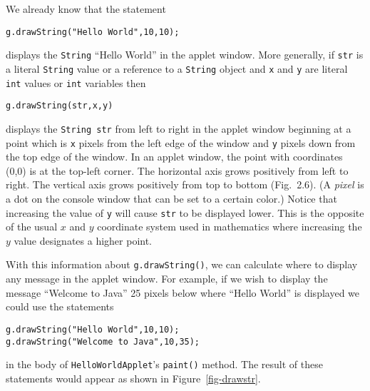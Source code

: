 We already know that the statement

\begin{jjjlisting}
\begin{lstlisting} 
g.drawString("Hello World",10,10);   
\end{lstlisting}
\end{jjjlisting}

\noindent displays the {\tt String} ``Hello World'' in the applet window.  More
generally, if {\tt str} is a literal {\tt String} value or a reference
to a {\tt String} object and {\tt x} and {\tt y} are literal {\tt int}
values or {\tt int} variables then

\begin{jjjlisting}
\begin{lstlisting}  
g.drawString(str,x,y) 
\end{lstlisting}
\end{jjjlisting}

\noindent displays the {\tt String str} from left to right in the applet window
beginning at a point which is {\tt x} pixels from the left edge of the
window and {\tt y} pixels down from the top edge of the window. In an
applet window, the point with coordinates (0,0) is at the top-left
corner. The horizontal axis grows positively from left to right. The
vertical axis grows positively from top to bottom (Fig.~2.6). 
(A {\em pixel} is a dot on the console window that can be set to a
certain color.)  Notice that increasing the value of {\tt y} will
cause {\tt str} to be displayed lower. This is the opposite of the
usual $x$ and $y$ coordinate system used in mathematics where
increasing the $y$ value designates a higher point.  

With this information about {\tt g.drawString()}, we can calculate
where to display any message in the applet window.  For example, if we
wish to display the message ``Welcome to Java'' 25 pixels below where
``Hello World'' is displayed we could use the statements

\begin{jjjlisting}
\begin{lstlisting}
g.drawString("Hello World",10,10);
g.drawString("Welcome to Java",10,35);
\end{lstlisting}
\end{jjjlisting}

\noindent in the body of {\tt HelloWorldApplet}'s {\tt paint()} method.  
The result of these statements would appear as shown in
Figure~\ref{fig-drawstr}.


